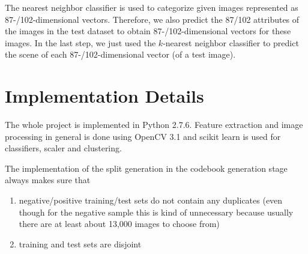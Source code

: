 \documentclass{vldb}
\begin{document}
The nearest neighbor classifier is used to categorize given images represented
as 87-/102-dimensional vectors. Therefore, we also predict the 87/102 attributes
of the images in the test dataset to obtain 87-/102-dimensional vectors for
these images. In the last step, we just used the $k$-nearest neighbor classifier
to predict the scene of each 87-/102-dimensional vector (of a test image).

\section{Implementation Details}
\label{sec:implementation-details}

The whole project is implemented in Python 2.7.6. Feature extraction and image
processing in general is done using OpenCV 3.1 and scikit learn is used
for classifiers, scaler and clustering.

The implementation of the split generation in the codebook generation stage always
makes sure that
\begin{enumerate}
  \item negative/positive training/test sets do not contain any duplicates (even
    though for the negative sample this is kind of unnecessary because usually
    there are at least about 13,000 images to choose from)
  \item training and test sets are disjoint
\end{enumerate}
\end{document}
